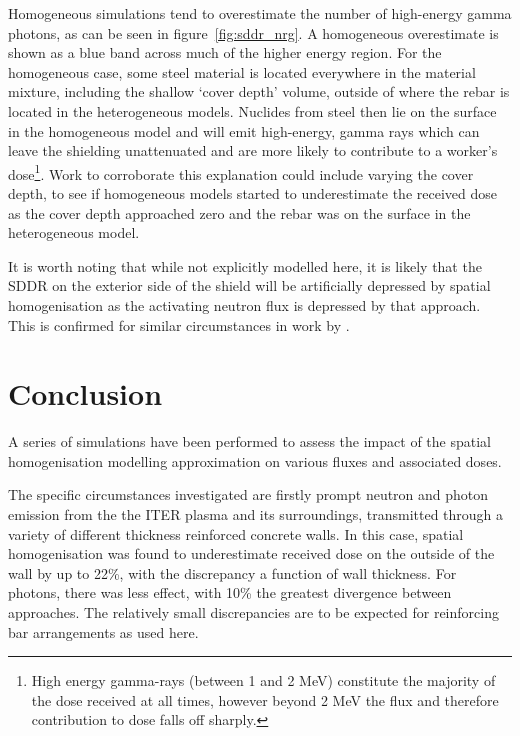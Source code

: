 Homogeneous simulations tend to overestimate the number of high-energy gamma photons, as can be seen in figure~\ref{fig:sddr_nrg}. A homogeneous overestimate is shown as a blue band across much of the higher energy region. For the homogeneous case, some steel material is located everywhere in the material mixture, including the shallow `cover depth' volume, outside of where the rebar is located in the heterogeneous models. Nuclides from steel then lie on the surface in the homogeneous model and will emit high-energy, gamma rays which can leave the shielding unattenuated and are more likely to contribute to a worker's dose\footnote{High energy gamma-rays (between 1 and 2 MeV) constitute the majority of the dose received at all times, however beyond 2 MeV the flux and therefore contribution to dose falls off sharply.}. Work to corroborate this explanation could include varying the cover depth, to see if homogeneous models started to underestimate the received dose as the cover depth approached zero and the rebar was on the surface in the heterogeneous model.

It is worth noting that while not explicitly modelled here, it is likely that the SDDR on the exterior side of the shield will be artificially depressed by spatial homogenisation as the activating neutron flux is depressed by that approach. This is confirmed for similar circumstances in work by \citeauthor{Sanz2014} \cite{Sanz2014}.


\FloatBarrier
\section{Conclusion}
A series of simulations have been performed to assess the impact of the spatial homogenisation modelling approximation on various fluxes and associated doses. 

The specific circumstances investigated are firstly prompt neutron and photon emission from the the ITER plasma and its surroundings, transmitted through a variety of different thickness reinforced concrete walls. In this case, spatial homogenisation was found to underestimate received dose on the outside of the wall by up to 22\%, with the discrepancy a function of wall thickness. For photons, there was less effect, with 10\% the greatest divergence between approaches. The relatively small discrepancies are to be expected for reinforcing bar arrangements as used here. 

